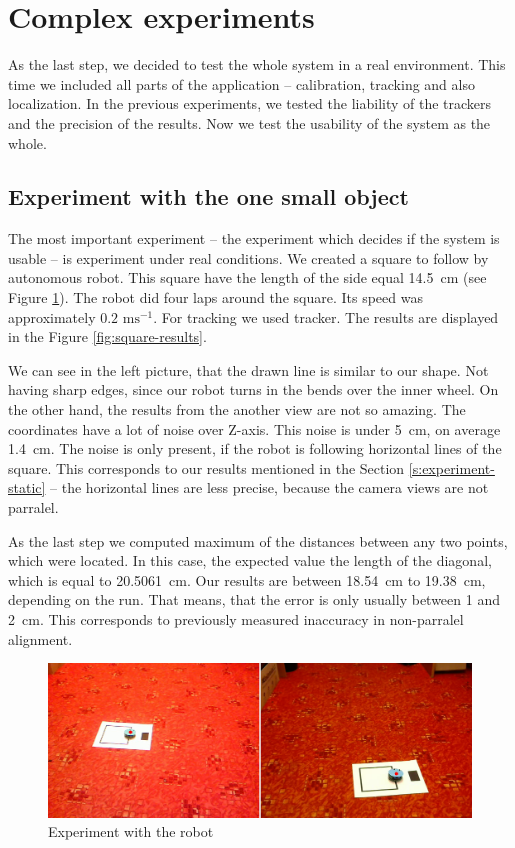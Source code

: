 \section{Complex experiments}

As the last step, we decided to test the whole system in a real environment. This
time we included all parts of the application -- calibration, tracking and also
localization. In the previous experiments, we tested the liability of the
trackers and the precision of the results. Now we test the usability of the
system as the whole.

\subsection{Experiment with the one small object}

The most important experiment -- the experiment which decides if the system is
usable -- is experiment under real conditions. We created a square to follow by
autonomous robot. This square have the length of the side equal 14.5~cm (see
Figure \ref{fig:robot-square}). The robot did four laps around the square. Its
speed was approximately $0.2 \text{ ms}^{-1}$. For tracking we used \hsv{}
tracker. The results are displayed in the Figure \ref{fig:square-results}.

We can see in the left picture, that the drawn line is similar to our shape.
Not having sharp edges, since our robot turns in the bends over the inner
wheel. On the other hand, the results from the another view are not so amazing.
The coordinates have a lot of noise over Z-axis. This noise is under 5~cm, on
average 1.4~cm. The noise is only present, if the robot is following horizontal
lines of the square. This corresponds to our results mentioned in the Section
\ref{s:experiment-static} -- the horizontal lines are less precise, because
the camera views are not parralel.

As the last step we computed maximum of the distances between any two points,
which were located. In this case, the expected value the length of the
diagonal, which is equal to 20.5061~cm. Our results are between 18.54~cm to
19.38~cm, depending on the run. That means, that the error is only usually
between 1 and 2~cm. This corresponds to previously measured inaccuracy in
non-parralel alignment.

\begin{figure}
\includegraphics[width=\linewidth]{img/experiments/square-robot.png}
\caption{Experiment with the robot}
\label{fig:robot-square}
\end{figure}

